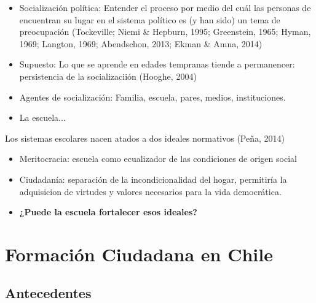 \documentclass[]{beamer} %
\begin{document}
\begin{frame}	
	\begin{itemize}
		\item Socialización política: Entender el proceso por medio del cuál las personas de encuentran su lugar en el sistema político es (y han sido) un tema de preocupación (Tockeville; Niemi \& Hepburn, 1995; Greenstein, 1965; Hyman, 1969; Langton, 1969; Abendschon, 2013; Ekman \& Amna, 2014) 
		
		\item Supuesto: Lo que se aprende en edades tempranas tiende a permanencer: persistencia de la socializaciión (Hooghe, 2004)
		
		\item Agentes de socialización: Familia, escuela, pares, medios, instituciones.
		
		\item La escuela...
		
	\end{itemize}
\end{frame}

\begin{frame}
	Los sistemas escolares nacen atados a dos ideales normativos (Peña, 2014)
	\begin{itemize}
		\item Meritocracia: escuela como ecualizador de las condiciones de origen social
		
		\item Ciudadanía: separación de la incondicionalidad del hogar, permitiría la adquisicion de virtudes y valores necesarios para la vida democrática.
		
		\item \textbf{¿Puede la escuela fortalecer esos ideales?}
		
	\end{itemize}
\end{frame}

	
\section{Formación Ciudadana en Chile}

\subsection{Antecedentes}
\end{document}
